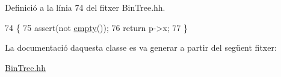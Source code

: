 Definició a la línia 74 del fitxer Bin\+Tree.\+hh.


\begin{DoxyCode}
74                             \{
75         assert(not \hyperlink{class_bin_tree_a74cda259ba5c25b8ee38ed4dc33e4fad}{empty}());
76         \textcolor{keywordflow}{return} p->x;
77     \}
\end{DoxyCode}


La documentació d\textquotesingle{}aquesta classe es va generar a partir del següent fitxer\+:\begin{DoxyCompactItemize}
\item 
\hyperlink{_bin_tree_8hh}{Bin\+Tree.\+hh}\end{DoxyCompactItemize}
